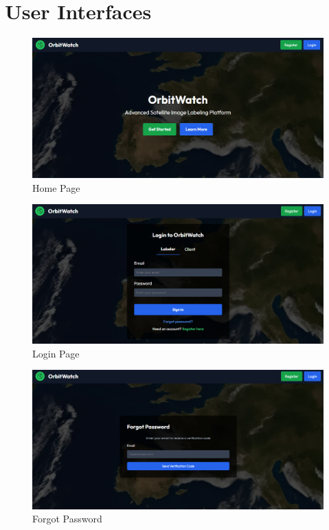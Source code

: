 \documentclass[12pt, titlepage]{article}
\begin{document}
\section{User Interfaces}
\begin{figure}[H]
    \centering
    \includegraphics[width=\linewidth]{home.png}
    \caption{Home Page}
\end{figure}
\begin{figure}[H]
    \centering
    \includegraphics[width=\linewidth]{login.png}
    \caption{Login Page}
\end{figure}
\begin{figure}[H]
    \centering
    \includegraphics[width=\linewidth]{forgot_password.png}
    \caption{Forgot Password}
\end{figure}
\end{document}
